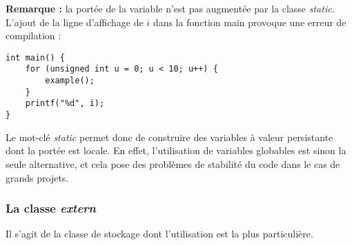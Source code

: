 \documentclass[../../../main.tex]{subfiles}
\begin{document}
\textbf{Remarque :} la portée de la variable n'est pas augmentée par la classe \textit{static}. L'ajout de la ligne d'affichage de $i$ dans la fonction \textsf{main} provoque une erreur de compilation :
\begin{verbatim}
int main() {
	for (unsigned int u = 0; u < 10; u++) {
		example();
	}
	printf("%d", i);
}
\end{verbatim}
Le mot-clé \textit{static} permet donc de construire des variables à valeur persistante dont la portée est locale. En effet, l'utilisation de variables globables est sinon la seule alternative, et cela pose des problèmes de stabilité du code dans le cas de grands projets.
\subsubsection{La classe \textit{extern}}
Il s'agit de la classe de stockage dont l'utilisation est la plus particulière.
\end{document}
